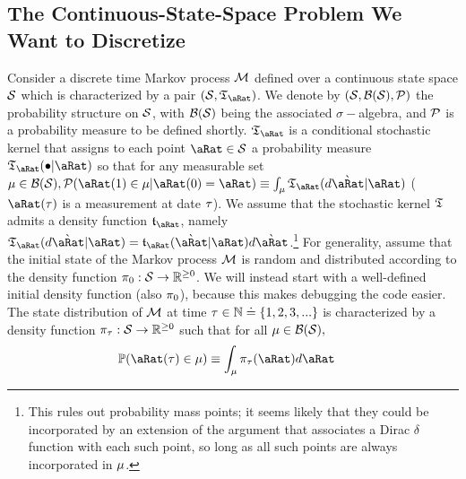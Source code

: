 \documentclass[\econtexRoot/BufferStockTheory.tex]{subfiles}
\begin{document}
\subsection{The Continuous-State-Space Problem We Want to Discretize} 
Consider a discrete time Markov process $\mathcal{M}$ defined over a continuous state space $\mathcal{S}$ which is characterized by a pair $(\SetFullCnts,\KrnPntNxtFmPntNow_{\pnt})$.   We denote by $(\mathcal{S},\mathcal{B}(\mathcal{S}),\mathcal{P})$ the probability structure on $\mathcal{S}$, with $\mathcal{B}(\mathcal{S})$ being the associated $\sigma-$algebra, and $\mathcal{P}$ is a probability measure to be defined shortly. $\KrnPntNxtFmPntNow_{\pnt}$ is a conditional stochastic kernel  that assigns to each point $\pnt \in \SetFullCnts$ a probability measure $\KrnPntNxtFmPntNow_{\pnt}(\bullet|\pnt)$ so that for any measurable set $\SetPartCnts \in \Borel(\SetFullCnts), \PrbFullCnts(\pnt(1) \in \SetPartCnts|\pnt(0)=\pnt) \equiv \int_{\SetPartCnts}\KrnPntNxtFmPntNow_{\pnt}(d\Nxt{\pnt}|\pnt)$ ($\pnt(\tAbs)$ is a measurement at date $\tau$).  We assume that the stochastic kernel $\mathfrak{T}$ admits a density function $\DnsPntNxtFmPntNow_{\pnt}$, namely $\KrnPntNxtFmPntNow_{\pnt}(d\Nxt{\pnt}|\pnt) = \DnsPntNxtFmPntNow_{\pnt}(\Nxt{\pnt}|\pnt)d\Nxt{\pnt}$.\footnote{This rules out probability mass points; it seems likely that they could be incorporated by an extension of the argument that associates a Dirac $\delta$ function with each such point, so long as all such points are always incorporated in $\mu$.}
For generality, \cite{saDiscrete,saQuantitative} assume that  the initial state of the Markov process $\mathcal{M}$ is random and distributed according to the density function $\pi_{0} : \mathcal{S} \rightarrow \mathbb{R}^{\geq 0}$.  We will instead start with a well-defined initial density function (also $\pi_{0}$), because this makes debugging the code easier.  The state distribution of $\mathcal{M}$ at time $\tau \in \mathbb{N} \doteq  \{1,2,3,...\}$ is characterized by a density function $\pi_{\tau} : \mathcal{S} \rightarrow \mathbb{R}^{\geq 0}$ such that for all $\mu \in \mathcal{B}({\mathcal{S}}),$
\begin{align}
  \PrbEvntSqnc(\pnt(\tAbs) \in \SetPartCnts) & \equiv \int_{\SetPartCnts} \DnsPnt_{\tAbs}(\pnt)d\pnt
\end{align}
\end{document}
